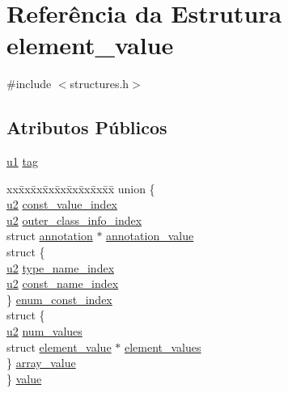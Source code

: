 \hypertarget{structelement__value}{}\section{Referência da Estrutura element\+\_\+value}
\label{structelement__value}


{\ttfamily \#include $<$structures.\+h$>$}

\subsection*{Atributos Públicos}
\begin{DoxyCompactItemize}
\item 
\hyperlink{lista__operandos_8h_ad9f4cdb6757615aae2fad89dab3c5470}{u1} \hyperlink{structelement__value_a2664460cf3cbd50f7116dcc6fc5dc049}{tag}
\item 
\begin{tabbing}
xx\=xx\=xx\=xx\=xx\=xx\=xx\=xx\=xx\=\kill
union \{\\
\>\hyperlink{lista__operandos_8h_a732cde1300aafb73b0ea6c2558a7a54f}{u2} \hyperlink{structelement__value_a8ba1271c398c892dcfc93197244c1a50}{const\_value\_index}\\
\>\hyperlink{lista__operandos_8h_a732cde1300aafb73b0ea6c2558a7a54f}{u2} \hyperlink{structelement__value_a194379118d41c95cec886acb9c4b9d02}{outer\_class\_info\_index}\\
\>struct \hyperlink{structannotation}{annotation} $\ast$ \hyperlink{structelement__value_af583fbf558e5dd08ffee4323d7f86fe9}{annotation\_value}\\
\>struct \{\\
\>\>\hyperlink{lista__operandos_8h_a732cde1300aafb73b0ea6c2558a7a54f}{u2} \hyperlink{structelement__value_ad1925807cc4b5a79fa7fa56d46462ecb}{type\_name\_index}\\
\>\>\hyperlink{lista__operandos_8h_a732cde1300aafb73b0ea6c2558a7a54f}{u2} \hyperlink{structelement__value_a44ed4ad39e3d38535f06cd844a86ad80}{const\_name\_index}\\
\>\} \hyperlink{structelement__value_ae8482fa795543c28cfff6de025bfe5a0}{enum\_const\_index}\\
\>struct \{\\
\>\>\hyperlink{lista__operandos_8h_a732cde1300aafb73b0ea6c2558a7a54f}{u2} \hyperlink{structelement__value_adcb3c2aa2aeef9f3c78b25162e99274e}{num\_values}\\
\>\>struct \hyperlink{structelement__value}{element\_value} $\ast$ \hyperlink{structelement__value_a1bb47f79171a2bd7a6efb5d5b4882c49}{element\_values}\\
\>\} \hyperlink{structelement__value_a97368440bfd85de2d3508ac9fdea93ff}{array\_value}\\
\} \hyperlink{structelement__value_a4e0b4dd7c57280a3c485e3f5d03bee80}{value}\\

\end{tabbing}\end{DoxyCompactItemize}



